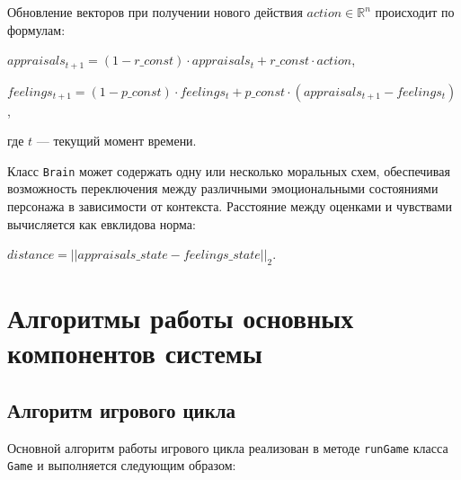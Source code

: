 Обновление векторов при получении нового действия $action \in \mathbb{R}^n$ происходит по формулам:
\begin{center}
$appraisals_{t+1} = (1 - r\_const) \cdot appraisals_t + r\_const \cdot action$,
\end{center}
\begin{center}
$feelings_{t+1} = (1 - p\_const) \cdot feelings_t + p\_const \cdot (appraisals_{t+1} - feelings_t)$,
\end{center}
\noindent где $t$ --- текущий момент времени.

Класс \texttt{Brain} может содержать одну или несколько моральных схем, обеспечивая возможность переключения между различными эмоциональными состояниями персонажа в зависимости от контекста. Расстояние между оценками и чувствами вычисляется как евклидова норма:
\begin{center}
$distance = ||appraisals\_state - feelings\_state||_2$.
\end{center}





\section{Алгоритмы работы основных компонентов системы}

\subsection{Алгоритм игрового цикла}

Основной алгоритм работы игрового цикла реализован в методе \texttt{runGame} класса \texttt{Game} и выполняется следующим образом:

